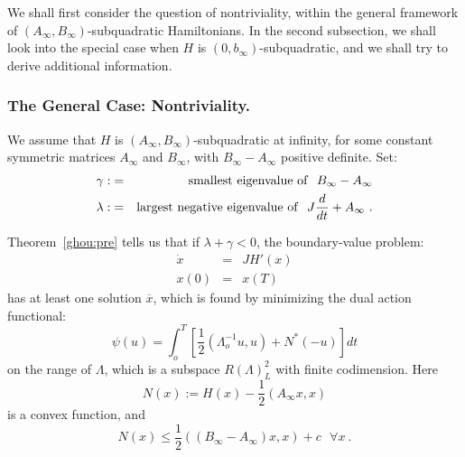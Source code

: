 \documentclass{llncs}
\begin{document}
We shall first consider the question of nontriviality, within the
general framework of
$\left(A_{\infty},B_{\infty}\right)$-subquadratic Hamiltonians. In
the second subsection, we shall look into the special case when $H$ is
$\left(0,b_{\infty}\right)$-subquadratic,
and we shall try to derive additional information.
%
\subsubsection{The General Case: Nontriviality.}
%
We assume that $H$ is
$\left(A_{\infty},B_{\infty}\right)$-sub\-qua\-dra\-tic at infinity,
for some constant symmetric matrices $A_{\infty}$ and $B_{\infty}$,
with $B_{\infty}-A_{\infty}$ positive definite. Set:
\begin{eqnarray}
\gamma :&=&{\rm smallest\ eigenvalue\ of}\ \ B_{\infty} - A_{\infty} \\
  \lambda : &=& {\rm largest\ negative\ eigenvalue\ of}\ \
  J \frac{d}{dt} +A_{\infty}\ .
\end{eqnarray}

Theorem~\ref{ghou:pre} tells us that if $\lambda +\gamma < 0$, the
boundary-value problem:
\begin{equation}
\begin{array}{rcl}
  \dot{x}&=&JH' (x)\\
  x(0)&=&x (T)
\end{array}
\end{equation}
has at least one solution
$\overline{x}$, which is found by minimizing the dual
action functional:
\begin{equation}
  \psi (u) = \int_{o}^{T} \left[\frac{1}{2}
  \left(\Lambda_{o}^{-1} u,u\right) + N^{\ast} (-u)\right] dt
\end{equation}
on the range of $\Lambda$, which is a subspace $R (\Lambda)_{L}^{2}$
with finite codimension. Here
\begin{equation}
  N(x) := H(x) - \frac{1}{2} \left(A_{\infty} x,x\right)
\end{equation}
is a convex function, and
\begin{equation}
  N(x) \le \frac{1}{2}
  \left(\left(B_{\infty} - A_{\infty}\right) x,x\right)
  + c\ \ \ \forall x\ .
\end{equation}
\end{document}

